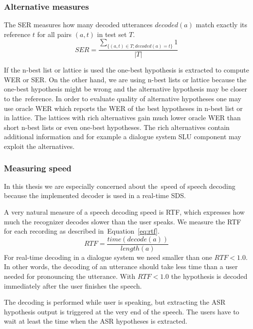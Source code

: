 \subsubsection*{Alternative measures}
The \acl{SER} measures how many decoded utterances $decoded(a)$ match exactly its reference $t$ for all pairs $(a, t)$ in test set $T$.
\begin{equation}
    SER = \frac{\sum_{\{(a, t) \in T; decoded(a) = t\}}{1}}{|T|}
\end{equation}

If the n-best list or lattice is used the one-best hypothesis is extracted to compute \ac{WER} or \ac{SER}.
On the other hand, we are using n-best lists or lattice because the one-best hypothesis might be wrong and the alternative hypothesis may be closer to the~reference.
In order to evaluate quality of alternative hypotheses one may use oracle \ac{WER} which reports the WER of the best hypotheses in n-best list or in lattice.
The lattices with rich alternatives gain much lower oracle \ac{WER} than short n-best lists or even one-best hypotheses.
The rich alternatives contain additional information and for example a dialogue system \acl{SLU} component may exploit the alternatives.

\subsubsection*{Measuring speed}
In this thesis we are especially concerned about the~speed of speech decoding because the implemented decoder is used in a real-time \acl{SDS}.

A very natural measure of a speech decoding speed is \acl{RTF}, which expresses how much the recognizer decodes slower than the user speaks.
We measure the \ac{RTF} for each recording as described in~Equation~\ref{eq:rtf}.
\begin{equation}\label{eq:rtf}
    RTF = \frac{time(decode(a))}{length(a)}
\end{equation}
For real-time decoding in a dialogue system we need smaller than one $RTF < 1.0$.
In other words, the decoding of an utterance should take less time than a user needed for pronouncing the utterance.
With $RTF < 1.0$ the hypothesis is decoded immediately after the user finishes the speech. 

The decoding is performed while user is speaking, but extracting the \ac{ASR} hypothesis output is triggered at the very end of the speech.
The users have to wait at least the time when the \ac{ASR} hypotheses is extracted.


